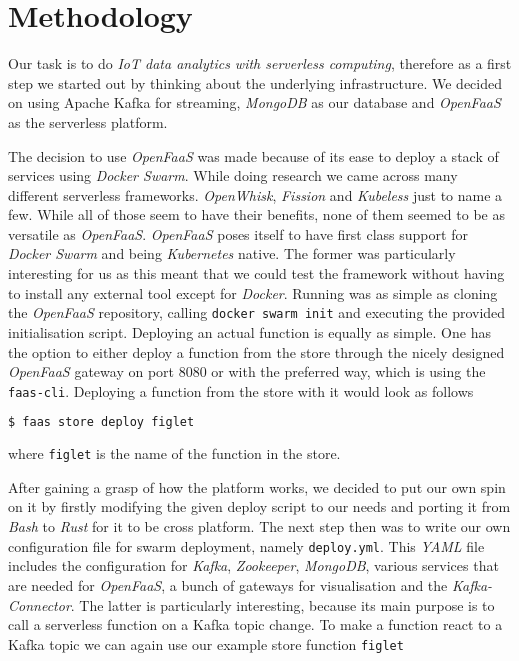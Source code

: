 \section{Methodology}


Our task is to do \textit{IoT data analytics with serverless computing}, therefore as a first step
we started out by thinking about the underlying infrastructure. We decided on using Apache Kafka for
streaming, \textit{MongoDB} as our database and \textit{OpenFaaS} as the serverless platform.

The decision to use \textit{OpenFaaS} was made because of its ease to deploy a stack of services
using \textit{Docker Swarm}. While doing research we came across many different serverless
frameworks. \textit{OpenWhisk}, \textit{Fission} and \textit{Kubeless} just to name a few. While all
of those seem to have their benefits, none of them seemed to be as versatile as \textit{OpenFaaS}.
\textit{OpenFaaS} poses itself to have first class support for \textit{Docker Swarm} and being
\textit{Kubernetes} native. The former was particularly interesting for us as this meant that we
could test the framework without having to install any external tool except for  \textit{Docker}.
Running was as simple as cloning the \textit{OpenFaaS} repository, calling \texttt{docker swarm
init} and executing the provided initialisation script. Deploying an actual function is equally as
simple. One has the option to either deploy a function from the store through the nicely designed
\textit{OpenFaaS} gateway on port 8080 or with the preferred way, which is using the
\texttt{faas-cli}. Deploying a function from the store with it would look as follows

\begin{lstlisting}[language=bash]
$ faas store deploy figlet
\end{lstlisting}

where \texttt{figlet} is the name of the function in the store.

After gaining a grasp of how the platform works, we decided to put our own spin on it by firstly
modifying the given deploy script to our needs and porting it from \textit{Bash} to \textit{Rust}
for it to be cross platform. The next step then was to write our own configuration file for swarm
deployment, namely \texttt{deploy.yml}. This \textit{YAML} file includes the configuration for
\textit{Kafka}, \textit{Zookeeper}, \textit{MongoDB}, various services that are needed for
\textit{OpenFaaS}, a bunch of gateways for visualisation and the \textit{Kafka-Connector}. The
latter is particularly interesting, because its main purpose is to call a serverless function on a
Kafka topic change. To make a function react to a Kafka topic we can again use our example store
function \texttt{figlet}

